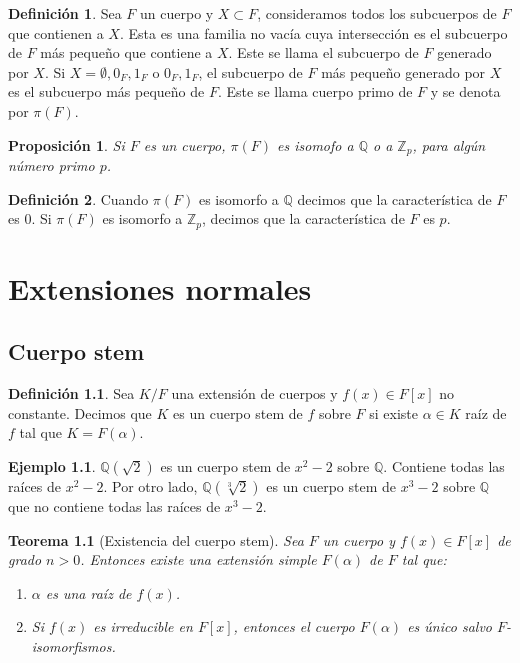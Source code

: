 \documentclass{report}
\newtheorem{theorem}{Teorema}[chapter]
\newtheorem{proposition}[theorem]{Proposición}
\theoremstyle{remark}
\theoremstyle{definition}
\newtheorem{definition}{Definición}[chapter]
\theoremstyle{definition}
\theoremstyle{definition}
\newtheorem*{example}{Ejemplo}
\begin{document}
\begin{definition}
    Sea $F$ un cuerpo y $X \subset F$, consideramos todos los subcuerpos de $F$ que contienen a $X$.
    Esta es una familia no vacía cuya intersección es el subcuerpo de $F$ más pequeño que contiene a $X$.
    Este se llama el subcuerpo de $F$ generado por $X$.
    Si $X = \emptyset, {0_F}, {1_F}$ o ${0_F, 1_F}$, el subcuerpo de $F$ más pequeño generado por $X$ es el subcuerpo más pequeño de $F$.
    Este se llama cuerpo primo de $F$ y se denota por $\pi(F)$.
\end{definition}

\begin{proposition}
    Si $F$ es un cuerpo, $\pi(F)$ es isomofo a $\mathbb{Q}$ o a $\mathbb{Z}_p$, para algún número primo $p$.
\end{proposition}

\begin{definition}
    Cuando $\pi(F)$ es isomorfo a $\mathbb{Q}$ decimos que la característica de $F$ es 0.
    Si $\pi(F)$ es isomorfo a $\mathbb{Z}_p$, decimos que la característica de $F$ es $p$.
\end{definition}

\chapter{Extensiones normales}
\section{Cuerpo stem}

\begin{definition}
    Sea $K/F$ una extensión de cuerpos y $f(x) \in F[x]$ no constante.
    Decimos que $K$ es un cuerpo stem de $f$ sobre $F$ si existe $\alpha \in K$ raíz de $f$ tal que $K = F(\alpha)$.
\end{definition}

\begin{example}
    $\mathbb{Q}(\sqrt{2})$ es un cuerpo stem de $x^2 - 2$ sobre $\mathbb{Q}$.
    Contiene todas las raíces de $x^2 - 2$.
    Por otro lado, $\mathbb{Q}(\sqrt[3]{2})$ es un cuerpo stem de $x^3 - 2$ sobre $\mathbb{Q}$ que no contiene todas las raíces de $x^3 - 2$.
\end{example}

\begin{theorem}[Existencia del cuerpo stem]
    Sea $F$ un cuerpo y $f(x) \in F[x]$ de grado $n > 0$. Entonces existe una extensión simple $F(\alpha)$ de $F$ tal que:
    \begin{enumerate}
        \item $\alpha$ es una raíz de $f(x)$.
        \item Si $f(x)$ es irreducible en $F[x]$, entonces el cuerpo $F(\alpha)$ es único salvo $F$-isomorfismos.
    \end{enumerate}
\end{theorem}
\end{document}
